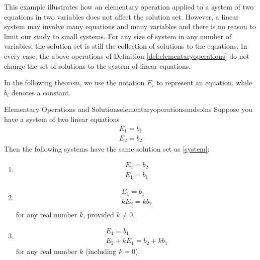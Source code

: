 This example illustrates how an elementary operation applied to a system of two equations in two variables
does not affect the solution set. However, a linear system may involve many equations and many variables and there is no 
reason to limit our study to small systems. For any size of system in any number of variables, the
solution set is still the collection of solutions to the equations. In every
case, the above operations of Definition \ref{def:elementaryoperations} do not
change the set of solutions to the system of linear equations.

In the following theorem, we use the notation $E_i$ to represent an equation, while $b_i$ denotes a
constant. 

\begin{theorem}{Elementary Operations and Solutions}{elementaryoperationsandsolns}
Suppose you have a system of two linear equations 
\begin{equation}
 \begin{array}{c}
  E_{1}=b_{1}\\
  E_{2}=b_{2}
\end{array} \label{system}
\end{equation}
Then the following systems have the same solution set as \ref{system}: 
\begin{enumerate}
\item   \begin{equation}
	\begin{array}{c}
	E_{2}=b_{2}\\
	E_{1}=b_{1}
	\end{array}
	\label{thm1.9.1}
	\end{equation}
\item  \begin{equation}
	\begin{array}{c}
	E_{1}=b_{1} \\
	kE_{2}=kb_{2}\\        
	\end{array}
	\label{thm1.9.2}
	\end{equation}
  for any real number $k$, provided $k\neq0$.
\item \begin{equation}
      \begin{array}{c}
       E_{1}=b_{1} \\
       E_{2}+kE_{1}=b_{2}+kb_{1}
       \end{array}  
	\label{thm1.9.3}
	\end{equation}
	for any real number  $k$ (including $k=0$).

\end{enumerate}
\end{theorem}

